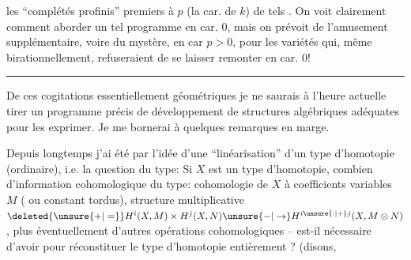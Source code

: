 les ``complétés profinis''  premiers à $p$ (la car. de $k$) de tels . On voit clairement comment aborder un tel programme en car. $0$, mais on prévoit de l'amusement supplémentaire, voire du mystère, en car $p>0$, pour les variétés qui, même birationnellement, refuseraient de se laisser remonter en car. $0$!

\begin{center}\rule{0.18\linewidth}{0.4pt}\end{center}

De ces cogitations essentiellement géométriques je ne saurais à l'heure actuelle tirer un programme précis de développement de structures algébriques adéquates pour les exprimer. Je me bornerai à quelques remarques en marge.

 Depuis longtemps j'ai été  par l'idée d'une ``linéarisation'' d'un type d'homotopie (ordinaire), i.e. la question du type: Si $X$ est un type d'homotopie, combien d'information cohomologique du type: cohomologie de $X$ à coefficients variables $M$ ( ou constant tordus), structure multiplicative $\deleted{\unsure{+|=}}H^i(X,M)\times H^j(X,N)\unsure{-|\to}H^{i\unsure{\cdot|+}j}(X,M\otimes N)$, plus éventuellement d'autres opérations cohomologiques -- est-il nécessaire d'avoir pour réconstituer le type d'homotopie entièrement ? (disons,
